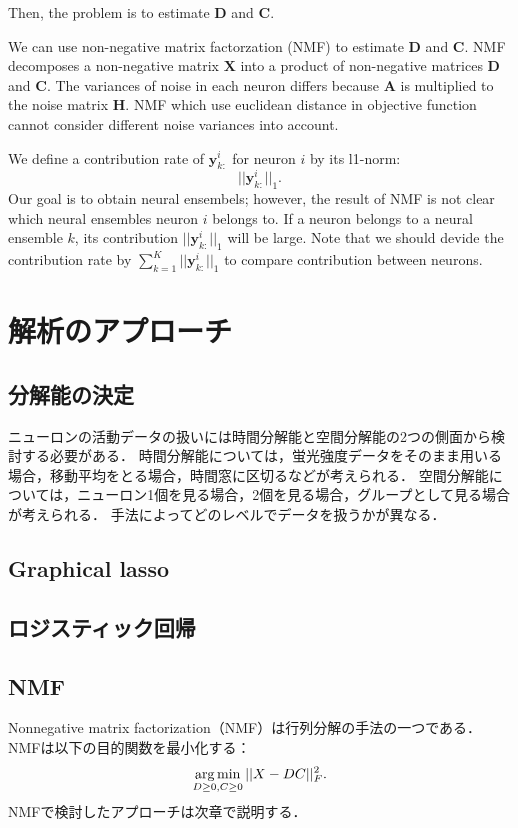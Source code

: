 Then, the problem is to estimate $\boldsymbol D$ and $\boldsymbol C$.

We can use non-negative matrix factorzation (NMF) to estimate $\boldsymbol D$ and $\boldsymbol C$.
NMF decomposes a non-negative matrix $\boldsymbol{X}$ into a product of non-negative matrices $\boldsymbol{D}$ and $\boldsymbol{C}$.
The variances of noise in each neuron differs because $\boldsymbol A$ is multiplied to the noise matrix $\boldsymbol H$.
NMF which use euclidean distance in objective function cannot consider different noise variances into account.

We define a contribution rate of $\boldsymbol{y}^i_{k:}$ for neuron $i$ by its l1-norm:
\begin{equation}
  || \boldsymbol{y}^i_{k:}||_1.
  \label{eq:contribution}
\end{equation}
Our goal is to obtain neural ensembels; however, the result of NMF is not clear which neural ensembles neuron $i$ belongs to.
If a neuron belongs to a neural ensemble $k$, its contribution $||\boldsymbol{y}^i_{k:}||_1$ will be large.
Note that we should devide the contribution rate by $\sum_{k=1}^K ||\boldsymbol{y}^i_{k:}||_1$ to compare contribution between neurons.

\section{解析のアプローチ}
\subsection{分解能の決定}
ニューロンの活動データの扱いには時間分解能と空間分解能の2つの側面から検討する必要がある．
時間分解能については，蛍光強度データをそのまま用いる場合，移動平均をとる場合，時間窓に区切るなどが考えられる．
空間分解能については，ニューロン1個を見る場合，2個を見る場合，グループとして見る場合が考えられる．
手法によってどのレベルでデータを扱うかが異なる．

\subsection{Graphical lasso}

\subsection{ロジスティック回帰}

\subsection{NMF}
Nonnegative matrix factorization（NMF）は行列分解の手法の一つである．
NMFは以下の目的関数を最小化する：
\begin{equation}
	\operatorname*{arg\,min}_{D \geq 0, C \geq 0} ||X - DC||_F^2.
  \label{eq:NMF}
\end{equation}
NMFで検討したアプローチは次章で説明する．
